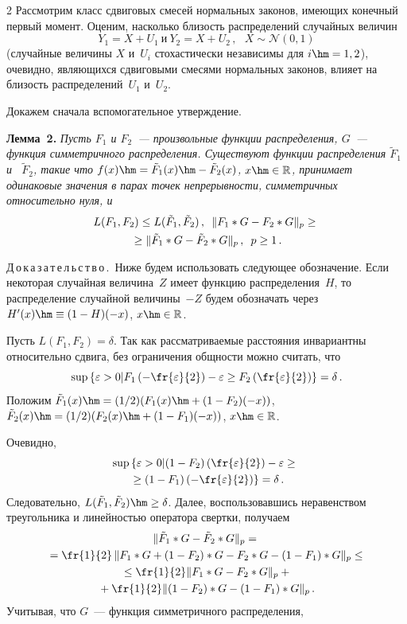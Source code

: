 \begin{multicols}{2}
Рассмотрим класс сдвиговых смесей нормальных законов, имеющих
конечный первый момент. Оценим, насколько близость распределений
случайных величин
$$
Y_1= X+U_1 \ \mbox{и} \  Y_2= X+U_2\,, \ \ \  X\sim\mathcal{N}(0,1)
$$
(случайные величины $X$ и~$U_i$ стохастически независимы для
$i\hm=1,2$), очевидно, являющихся сдвиговыми смесями нормальных
законов, влияет на близость распределений~$U_1$ и~$U_2$.

Докажем сначала вспомогательное утверждение.

\medskip

\noindent
\textbf{Лемма~2.}
\textit{Пусть  $F_1$ и  $F_2$~--- произвольные функции распределения, $G$~---
функция симметричного распределения. Существуют функции
распределения  $\tilde F_1$ и~ $\tilde F_2$, такие что $f(x) \hm=
\tilde F_1(x) \hm- \tilde F_2(x)$, $x \hm\in \mathbb{R}$,  принимает
одинаковые значения в парах точек непрерывности, симметричных
относительно нуля, и}
\begin{multline*}
L(F_1,F_2) \le L(\tilde F_1,\tilde F_2)\,,  \enskip
\|
F_1*G - F_2*G \|_{p} \ge{}\\
{}\ge \|
\tilde F_1*G - \tilde F_2*G
\|_{p}\,,  \enskip p\ge1\,.
\end{multline*}



\noindent
Д\,о\,к\,а\,з\,а\,т\,е\,л\,ь\,с\,т\,в\,о\,.\ 
Ниже будем использовать следующее обозначение. Если некоторая
случайная величина~$Z$ имеет функцию распределения~$H$, то
распределение случайной величины~$-Z$ будем обозначать через
$H'(x)\hm\equiv(1 - H)(-x)$, $x \hm\in \mathbb{R}$.

Пусть $L(F_1,F_2) = \delta$. Так как рассматриваемые расстояния
инвариантны относительно сдвига, без ограничения общности можно считать, что
$$
\sup \left\{ \varepsilon > 0 |
F_1\left(- \fr{\varepsilon}{2}  \right) - \varepsilon \geq F_2\left(
\fr{\varepsilon}{2} \right)  \right\} = \delta\,.
$$
Положим 
$\tilde F_1(x) \hm= (1/2)(F_1(x)  \hm+ (1 - F_2)(-x))$, 
$\tilde F_2(x) \hm= (1/2)(F_2(x) \hm + (1 - F_1)(-x))$, 
$x \hm\in \mathbb{R}$.

Очевидно,
\begin{multline*}
\sup \left\{ \varepsilon > 0 |
(1 - F_2)\left( \fr{\varepsilon}{2}  \right) - \varepsilon \geq {}\right.\\
\left.{}\geq(1 - F_1)\left(
-\fr{\varepsilon}{2} \right)  \right\} =
 \delta\,.
\end{multline*}
Следовательно, $L(\tilde F_1,\tilde F_2) \hm\ge \delta$. Далее,
воспользовавшись неравенством треугольника и линейностью оператора
свертки, получаем
\begin{multline}
\|
\tilde F_1*G - \tilde F_2*G
\|_{p}  ={}\\
{}=
 \fr{1}{2}\,
\|
 F_1*G  + (1-F_2)*G  -  F_2 * G - (1-F_1) * G
\|_{p}\le{}\\
{}\le
\fr{1}{2}\|
 F_1*G    -  F_2 * G
\|_{p}+{}\\
{}+\fr{1}{2}\|
 (1-F_2) * G  - (1-F_1)*G
\|_{p}\,.
\label{symmetrLemm}
\end{multline}
Учитывая, что $G$~--- функция симметричного распределения,


\end{multicols}
